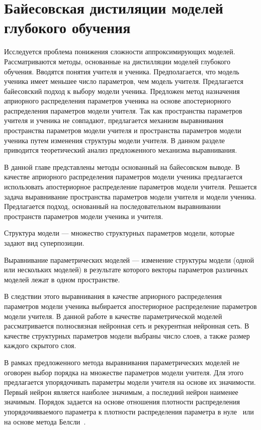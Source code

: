 \chapter{Байесовская дистиляции моделей глубокого обучения}
Исследуется проблема понижения сложности аппроксимирующих моделей. 
Рассматриваются методы, основанные на дистилляции моделей глубокого обучения. 
Вводятся понятия учителя и ученика. Предполагается, что модель ученика имеет меньшее число параметров, чем модель учителя. 
Предлагается байесовский подход к выбору модели ученика. 
Предложен метод назначения априорного распределения параметров ученика на основе апостериорного распределения параметров модели учителя. 
Так как пространства параметров учителя и ученика не совпадают, предлагается механизм выравнивания пространства параметров модели учителя и пространства параметров модели ученика путем изменения структуры модели учителя.
В данном разделе приводится теоретический анализ предложенного механизма выравнивания.

В данной главе представлены методы основанный на байесовском выводе.
В качестве априорного распределения параметров модели ученика предлагается использовать апостериорное распределение параметров модели учителя.
Решается задача выравнивание пространства параметров модели учителя и модели ученика.
Предлагается подход, основанный на последовательном выравнивании пространств параметров модели ученика и учителя. 
\begin{definition}
\label{def:structure}
Структура модели --- множество структурных параметров модели, которые задают вид суперпозиции.
\end{definition}
\begin{definition}
\label{def:sopos}
Выравнивание параметрических моделей --- изменение структуры модели (одной или нескольких моделей) в результате которого векторы параметров различных моделей лежат в одном пространстве.
\end{definition}
В следствии этого выравнивания в качестве априорного распределения параметров модели ученика выбирается апостериорное распределение параметров модели учителя.
В данной работе в качестве параметрической моделей рассматривается полносвязная нейронная сеть и рекурентная нейронная сеть.
В качестве структурных параметров модели выбраны число слоев, а также размер каждого скрытого слоя.

В рамках предложенного метода выравнивания параметрических моделей не оговорен выбор порядка на множестве параметров модели учителя.
Для этого предлагается упорядочивать параметры модели учителя на основе их значимости.
Первый нейрон является наиболее значимым, а последний нейрон наименее значимым.
Порядок задается на основе отношения плотности распределения упорядочивваемого параметра к плотности распределения параметра в нуле~\cite{graves2011} или на основе метода Белсли~\cite{grabovoy2019}.

